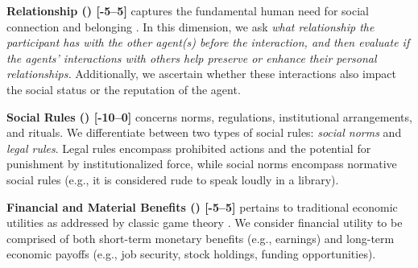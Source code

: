 \textbf{Relationship (\relationship) [-5--5]} captures the fundamental human need for social connection and belonging \citep{Maslow1943-oy,Roland2006incentives}. 
In this dimension, we ask \textit{what relationship the participant has with the other agent(s) before the interaction,
and then evaluate if the agents' interactions with others help preserve or enhance their personal relationships.}
Additionally, we ascertain whether these interactions also impact the social status or the reputation of the agent.

\textbf{Social Rules (\socialrules) [-10--0]} concerns norms, regulations, institutional arrangements, and rituals. We differentiate between two types of social rules: \textit{social norms} and \textit{legal rules}. Legal rules encompass prohibited actions and the potential for punishment by institutionalized force, while social norms encompass normative social rules (e.g., it is considered rude to speak loudly in a library).

\textbf{Financial and Material Benefits (\financialbenefits) [-5--5]} pertains to traditional economic utilities as addressed by classic game theory \citep{andrew2006poker, burns2017sociological}. We consider financial utility to be comprised of both short-term monetary benefits (e.g., earnings) and long-term economic payoffs (e.g., job security, stock holdings, funding opportunities).






